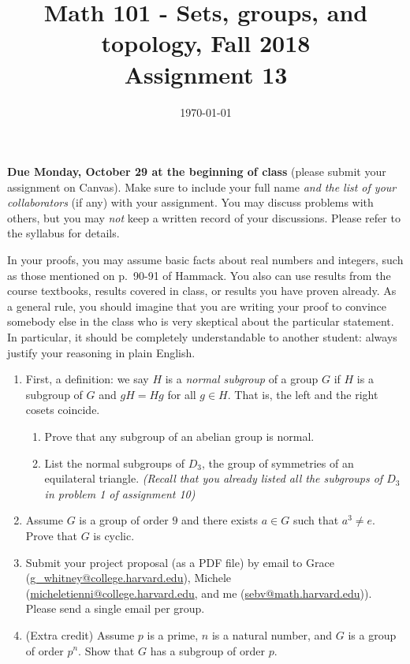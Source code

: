 \documentclass{amsart}
\title[Math 101, Fall 2018: assignment 13]{Math 101 - Sets, groups, and topology, Fall 2018 \\ Assignment 13}
\date{\today}
\theoremstyle{definition}
\begin{document}

\maketitle

\textbf{Due Monday, October 29 at the beginning of class} (please submit your assignment on Canvas). Make sure to include your full name \emph{and the list of your collaborators} (if any) with your assignment. You may discuss problems with others, but you may \emph{not} keep a written record of your discussions. Please refer to the syllabus for details.

In your proofs, you may assume basic facts about real numbers and integers, such as those mentioned on p.~90-91 of Hammack. You also can use results from the course textbooks, results covered in class, or results you have proven already. As a general rule, you should imagine that you are writing your proof to convince somebody else in the class who is very skeptical about the particular statement. In particular, it should be completely understandable to another student: always justify your reasoning in plain English. 

\begin{enumerate}


\item First, a definition: we say $H$ is a \emph{normal subgroup} of a group $G$ if $H$ is a subgroup of $G$ and $gH = Hg$ for all $g \in H$. That is, the left and the right cosets coincide.

  \begin{enumerate}
  \item Prove that any subgroup of an abelian group is normal.
  \item List the normal subgroups of $D_3$, the group of symmetries of an equilateral triangle. \emph{(Recall that you already listed all the subgroups of $D_3$ in problem 1 of assignment 10)}
  \end{enumerate}
\item Assume $G$ is a group of order $9$ and there exists $a \in G$ such that $a^3 \neq e$. Prove that $G$ is cyclic.
  
\item Submit your project proposal (as a PDF file) by email to Grace (\url{g_whitney@college.harvard.edu}), Michele (\url{micheletienni@college.harvard.edu}, and me (\url{sebv@math.harvard.edu})). Please send a single email per group. 
\item (Extra credit) Assume $p$ is a prime, $n$ is a natural number, and $G$ is a group of order $p^n$. Show that $G$ has a subgroup of order $p$.
\end{enumerate}



\end{document}
